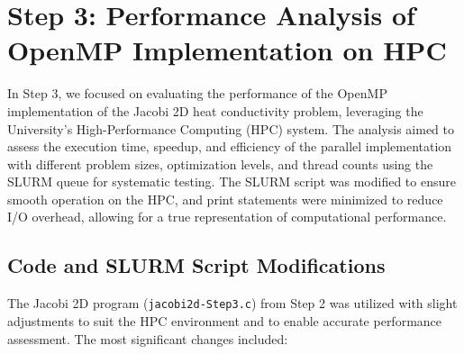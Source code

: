 \documentclass{article}
\begin{document}
\section{Step 3: Performance Analysis of OpenMP Implementation on HPC}

In Step 3, we focused on evaluating the performance of the OpenMP implementation of the Jacobi 2D heat conductivity problem, leveraging the University's High-Performance Computing (HPC) system. The analysis aimed to assess the execution time, speedup, and efficiency of the parallel implementation with different problem sizes, optimization levels, and thread counts using the SLURM queue for systematic testing. The SLURM script was modified to ensure smooth operation on the HPC, and print statements were minimized to reduce I/O overhead, allowing for a true representation of computational performance.

\subsection{Code and SLURM Script Modifications}

The Jacobi 2D program (\texttt{jacobi2d-Step3.c}) from Step 2 was utilized with slight adjustments to suit the HPC environment and to enable accurate performance assessment. The most significant changes included:
\end{document}

